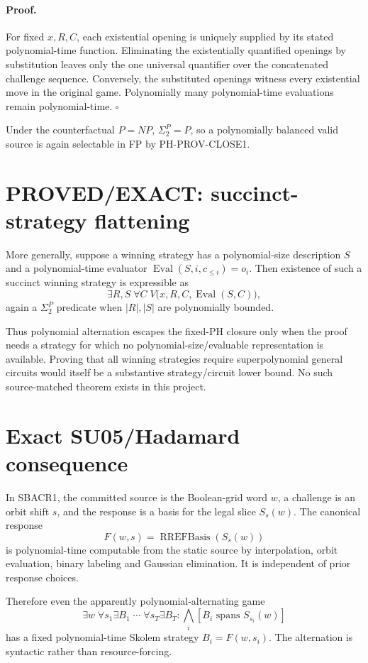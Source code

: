 \documentclass[11pt]{article}
\begin{document}
\paragraph{Proof.}
For fixed \(x,R,C\), each existential opening is uniquely supplied by its stated polynomial-time function. Eliminating the existentially quantified openings by substitution leaves only the one universal quantifier over the concatenated challenge sequence. Conversely, the substituted openings witness every existential move in the original game. Polynomially many polynomial-time evaluations remain polynomial-time. \(\square\)

Under the counterfactual \(P=NP\), \(\Sigma_2^P=P\), so a polynomially balanced valid source is again selectable in FP by PH-PROV-CLOSE1.

\section*{PROVED/EXACT: succinct-strategy flattening}
More generally, suppose a winning strategy has a polynomial-size description \(S\) and a polynomial-time evaluator \(\operatorname{Eval}(S,i,c_{\le i})=o_i\). Then existence of such a succinct winning strategy is expressible as
\[
\boxed{\exists R,S\;\forall C\;V\bigl(x,R,C,\operatorname{Eval}(S,C)\bigr),}
\]
again a \(\Sigma_2^P\) predicate when \(|R|,|S|\) are polynomially bounded.

Thus polynomial alternation escapes the fixed-PH closure only when the proof needs a strategy for which no polynomial-size/evaluable representation is available. Proving that all winning strategies require superpolynomial general circuits would itself be a substantive strategy/circuit lower bound. No such source-matched theorem exists in this project.

\section*{Exact SU05/Hadamard consequence}
In SBACR1, the committed source is the Boolean-grid word \(w\), a challenge is an orbit shift \(s\), and the response is a basis for the legal slice \(S_s(w)\). The canonical response
\[
F(w,s)=\operatorname{RREFBasis}(S_s(w))
\]
is polynomial-time computable from the static source by interpolation, orbit evaluation, binary labeling and Gaussian elimination. It is independent of prior response choices.

Therefore even the apparently polynomial-alternating game
\[
\exists w\;\forall s_1\exists B_1\;\cdots\;\forall s_T\exists B_T:\bigwedge_i [B_i\text{ spans }S_{s_i}(w)]
\]
has a fixed polynomial-time Skolem strategy \(B_i=F(w,s_i)\). The alternation is syntactic rather than resource-forcing.
\end{document}
